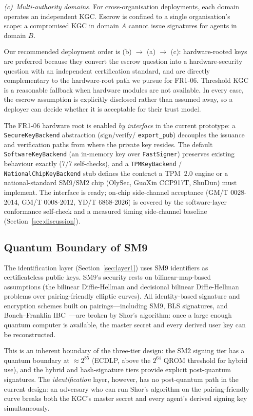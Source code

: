 \documentclass[10pt,twocolumn]{IEEEtran}
\begin{document}
\emph{(c)~Multi-authority domains.} For cross-organisation
deployments, each domain operates an independent KGC. Escrow is
confined to a single organisation's scope: a compromised KGC in
domain $A$ cannot issue signatures for agents in domain $B$.

Our recommended deployment order is (b) $\rightarrow$ (a) $\rightarrow$
(c): hardware-rooted keys are preferred because they convert the
escrow question into a hardware-security question with an
independent certification standard, and are directly complementary
to the hardware-root path we pursue for FR1-06. Threshold KGC is a
reasonable fallback when hardware modules are not available. In every
case, the escrow assumption is explicitly disclosed rather than
assumed away, so a deployer can decide whether it is acceptable for
their trust model.

The FR1-06 hardware root is enabled \emph{by interface} in the current
prototype: a \texttt{SecureKeyBackend} abstraction (sign/verify/
\texttt{export\_pub}) decouples the issuance and verification paths from
where the private key resides. The default \texttt{SoftwareKeyBackend}
(an in-memory key over \texttt{FastSigner}) preserves existing behaviour
exactly (7/7 self-checks), and a \texttt{TPMKeyBackend} / 
\texttt{NationalChipKeyBackend} stub defines the contract a TPM~2.0
engine or a national-standard SM9/SM2 chip (OlySec, GuoXin
CCP917T, ShuDun) must implement. The interface is ready; on-chip
side-channel acceptance (GM/T 0028-2014, GM/T 0008-2012,
YD/T 6868-2026) is covered by the software-layer conformance
self-check and a measured timing side-channel baseline
(Section~\ref{sec:discussion}).

\subsection{Quantum Boundary of SM9}

The identification layer (Section~\ref{sec:layer1}) uses SM9
identifiers as certificateless public keys. SM9's security rests on
bilinear-map-based assumptions (the bilinear Diffie-Hellman and
decisional bilinear Diffie-Hellman problems over pairing-friendly
elliptic curves). All identity-based signature and encryption schemes
built on pairings---including SM9, BLS signatures, and Boneh--Franklin
IBC~\cite{ref:sm9-std,ref:sm9-survey}---are broken by Shor's
algorithm: once a large enough quantum computer is available, the
master secret and every derived user key can be reconstructed.

This is an inherent boundary of the three-tier design: the SM2 signing tier
has a quantum boundary at $\approx 2^{85}$ (ECDLP, above the
$2^{64}$ QROM threshold for hybrid use), and the hybrid and
hash-signature tiers provide explicit post-quantum signatures. The
\emph{identification} layer, however, has no post-quantum path in the
current design: an adversary who can run Shor's algorithm on the
pairing-friendly curve breaks both the KGC's master secret and every
agent's derived signing key simultaneously.
\end{document}
